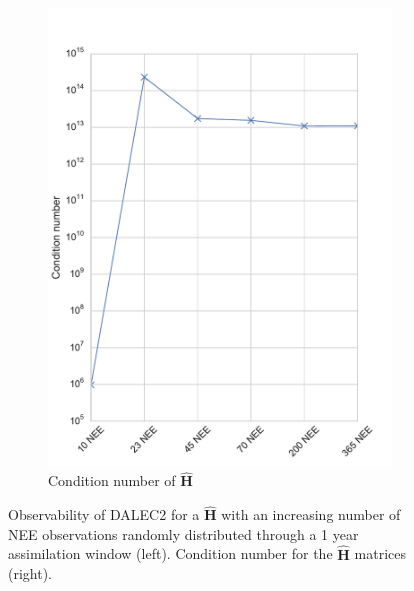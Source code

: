 \begin{figure}[ht]
    \begin{subfigure}[b]{0.4\textwidth}
        \includegraphics[width=\textwidth]{chapter/chapter5/dalec2_obsrankcondwind.pdf}
        \caption{Condition number of $\hat{\textbf{H}}$}
        \label{chap5:fig:D2_observabilitycondwind}
    \end{subfigure}
    \caption{Observability of DALEC2 for a $\hat{\textbf{H}}$ with an increasing number of NEE observations randomly distributed through a 1 year assimilation window (left). Condition number for the $\hat{\textbf{H}}$ matrices (right).}
    \label{chap5:fig:D2_observabilitywind}
\end{figure}

